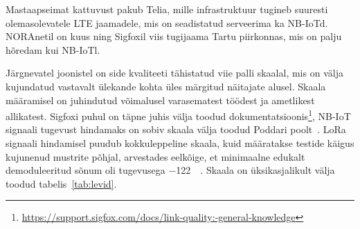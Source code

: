 \documentclass[12pt]{article}
\begin{document}
    Mastaapseimat kattuvust pakub Telia, mille infrastruktuur tugineb suuresti olemasolevatele LTE jaamadele, mis on seadistatud serveerima ka NB-IoTd.
    NORAnetil on kuus ning Sigfoxil viis tugijaama Tartu piirkonnas, mis on palju hõredam kui NB-IoTl.

    Järgnevatel joonistel on side kvaliteeti tähistatud viie palli skaalal, mis on välja kujundatud vastavalt ülekande kohta üles märgitud näitajate alusel.
    Skaala määramisel on juhindutud võimalusel varasematest töödest ja ametlikest allikatest.
    Sigfoxi puhul on täpne juhis välja toodud dokumentatsioonis\footnote{\url{https://support.sigfox.com/docs/link-quality:-general-knowledge}}, NB-IoT signaali tugevust hindamaks on sobiv skaala välja toodud Poddari poolt~\cite{poddar2020}.
    LoRa signaali hindamisel puudub kokkuleppeline skaala, kuid määratakse testide käigus kujunenud mustrite põhjal, arvestades eelkõige, et minimaalne edukalt demoduleeritud sõnum oli tugevusega \SI{-122}{\deci\belm}.
    Skaala on üksikasjalikult välja toodud tabelis~\ref{tab:levid}.
\end{document}
